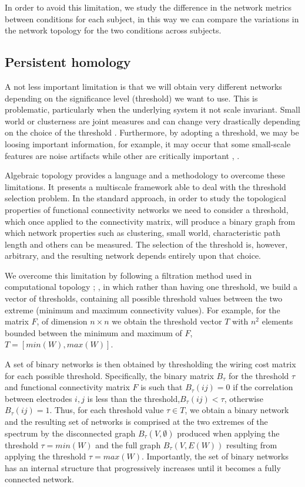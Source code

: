 \documentclass[11pt, onecolumn]{article}
\begin{document}
In order to avoid this limitation, we study the difference in the network metrics between conditions for each subject, in this way we can compare the variations in the network topology for the two conditions across subjects.


\subsection{Persistent homology}
A not less important limitation is that we will obtain very different networks depending on the significance level (threshold) we want to use. This is problematic, particularly when the underlying system it not scale invariant. Small world or clusterness are joint measures and can change very drastically depending on the choice of the threshold \cite{toppi2012statistical}. Furthermore, by adopting a threshold, we may be loosing important information, for example, it may occur that some small-scale features are noise artifacts while other are critically important \cite{fallani2014graph}, \cite{papo2014complex}.

Algebraic topology \cite{munkres1984elements} provides a language and a methodology to overcome these limitations. It presents a multiscale framework able to deal with the threshold selection problem.
In the standard approach, in order to study the  topological properties of functional connectivity networks we need to consider a threshold, which once applied to the connectivity matrix, will produce a binary graph from which network properties such as clustering, small world, characteristic path length and others can be measured. 
The selection of the threshold is, however, arbitrary, and the resulting network depends entirely upon that choice.

We overcome this limitation by following a filtration method used in computational topology \citep{dabaghian2014reconceiving}; \citep{dotko2016topological}, in which rather than having one threshold, we build a vector of thresholds, containing all possible threshold values between the two extreme (minimum and maximum connectivity values). For example, for the matrix $F$, of dimension $n \times n$ we obtain the threshold vector $T$ with $n^2$ elements bounded between the minimum and maximum of $F$, $T = [min(W), max(W)]$.

A set of binary networks is then obtained by thresholding the wiring cost matrix for each possible threshold. Specifically, the binary matrix $B_{\tau}$ for the threshold $\tau$ and functional connectivity matrix $F$ is such that $B_{\tau}(ij) =0$ if the correlation between electrodes $i,j$ is less than the threshold,$B_{\tau}(ij)<\tau$, otherwise $B_{\tau}(ij)=1$. 
Thus, for each threshold value $\tau \in T$, we obtain a binary network and the resulting set of networks is comprised at the two extremes of the spectrum by the disconnected graph $B_{\tau}(V,\emptyset)$ produced when applying the threshold $\tau = min(W)$ and the full graph $B_{\tau}(V,E(W))$ resulting from applying the threshold $\tau = max(W)$. 
Importantly, the set of binary networks has an internal structure that progressively increases until it becomes a fully connected network. 
\end{document}
